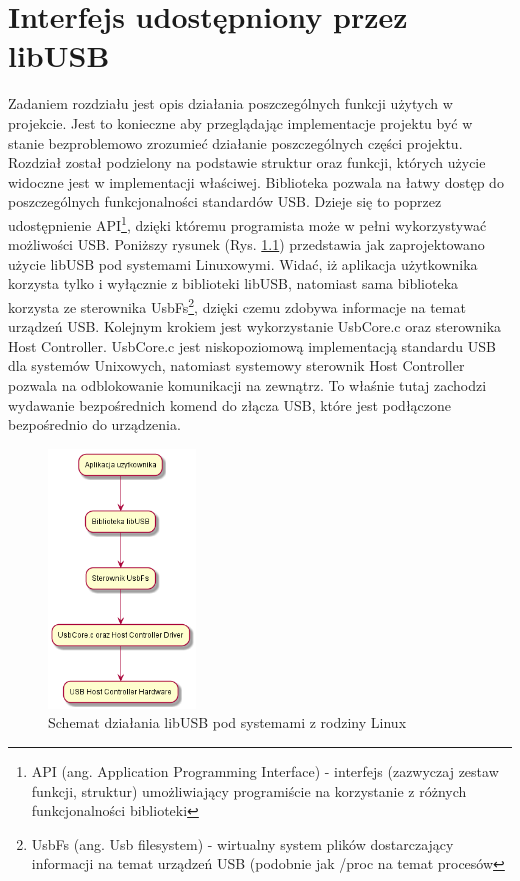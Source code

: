 \documentclass{BscUS}
\begin{document}
\chapter{Interfejs udostępniony przez libUSB}
\label{libUsbChapter}
\indent Zadaniem rozdziału jest opis działania poszczególnych funkcji użytych w projekcie. Jest to konieczne aby przeglądając implementacje projektu być w stanie bezproblemowo zrozumieć działanie poszczególnych części projektu. Rozdział został podzielony na podstawie struktur oraz funkcji, których użycie widoczne jest w implementacji właściwej. \cite{libusbDoc}
\newline
\indent Biblioteka pozwala na łatwy dostęp do poszczególnych funkcjonalności standardów USB. Dzieje się to poprzez udostępnienie API\footnote{API (ang. Application Programming Interface) - interfejs (zazwyczaj zestaw funkcji, struktur) umożliwiający programiście na korzystanie z różnych funkcjonalności biblioteki}, dzięki któremu programista może w pełni wykorzystywać możliwości USB. Poniższy rysunek (Rys. \ref{fig:libUsbSchemaLinux}) przedstawia jak zaprojektowano użycie libUSB pod systemami Linuxowymi. Widać, iż aplikacja użytkownika korzysta tylko i wyłącznie z biblioteki libUSB, natomiast sama biblioteka korzysta ze sterownika UsbFs\footnote{UsbFs (ang. Usb filesystem) - wirtualny system plików dostarczający informacji na temat urządzeń USB (podobnie jak /proc na temat procesów}, dzięki czemu zdobywa informacje na temat urządzeń USB. Kolejnym krokiem jest wykorzystanie UsbCore.c oraz sterownika Host Controller. UsbCore.c jest niskopoziomową implementacją standardu USB dla systemów Unixowych, natomiast systemowy sterownik Host Controller pozwala na odblokowanie komunikacji na zewnątrz. To właśnie tutaj zachodzi wydawanie bezpośrednich komend do złącza USB, które jest podłączone bezpośrednio do urządzenia. 
\begin{figure}[H]
\centering
\includegraphics[width=0.35\textwidth]{./img/libUsbSchemaLinux}
\caption{Schemat działania libUSB pod systemami z rodziny Linux} 
\label{fig:libUsbSchemaLinux}
\end{figure}
\end{document}
